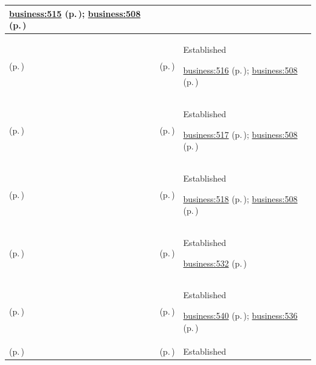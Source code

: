\begin{longtable}{|>{\raggedright\arraybackslash}p{0.27\TableWidth}|>{\raggedright\arraybackslash}p{0.27\TableWidth}|>{\raggedright\arraybackslash}p{0.46\TableWidth}|}
 \hyperref[rad:business:510]{business:515} (p.\,\pageref{rad:business:510}); \hyperref[rad:business:508]{business:508} (p.\,\pageref{rad:business:508})\\\hline
\nameref{cap:bc-clinical-technology-management} (p.\,\pageref{cap:bc-clinical-technology-management}) & \nameref{cap:bc-clinical-device-integration-provision} (p.\,\pageref{cap:bc-clinical-device-integration-provision}) & Established

 \hyperref[rad:business:510]{business:516} (p.\,\pageref{rad:business:510}); \hyperref[rad:business:508]{business:508} (p.\,\pageref{rad:business:508})\\\hline
\nameref{cap:bc-clinical-technology-management} (p.\,\pageref{cap:bc-clinical-technology-management}) & \nameref{cap:bc-clinical-device-data-integration} (p.\,\pageref{cap:bc-clinical-device-data-integration}) & Established

 \hyperref[rad:business:510]{business:517} (p.\,\pageref{rad:business:510}); \hyperref[rad:business:508]{business:508} (p.\,\pageref{rad:business:508})\\\hline
\nameref{cap:bc-clinical-technology-management} (p.\,\pageref{cap:bc-clinical-technology-management}) & \nameref{cap:bc-clinical-device-lifecycle-management} (p.\,\pageref{cap:bc-clinical-device-lifecycle-management}) & Established

 \hyperref[rad:business:510]{business:518} (p.\,\pageref{rad:business:510}); \hyperref[rad:business:508]{business:508} (p.\,\pageref{rad:business:508})\\\hline
\nameref{cap:bc-clinical-quality-safety-improvement} (p.\,\pageref{cap:bc-clinical-quality-safety-improvement}) & \nameref{cap:bc-clinical-safety-management} (p.\,\pageref{cap:bc-clinical-safety-management}) & Established

 \hyperref[rad:business:532]{business:532} (p.\,\pageref{rad:business:532})\\\hline
\nameref{cap:bc-clinical-safety-management} (p.\,\pageref{cap:bc-clinical-safety-management}) & \nameref{cap:bc-clinical-risk-identification} (p.\,\pageref{cap:bc-clinical-risk-identification}) & Established

 \hyperref[rad:business:538]{business:540} (p.\,\pageref{rad:business:538}); \hyperref[rad:business:536]{business:536} (p.\,\pageref{rad:business:536})\\\hline
\nameref{cap:bc-clinical-safety-management} (p.\,\pageref{cap:bc-clinical-safety-management}) & \nameref{cap:bc-clinical-risk-mitigation-management} (p.\,\pageref{cap:bc-clinical-risk-mitigation-management}) & Established


\end{longtable}
